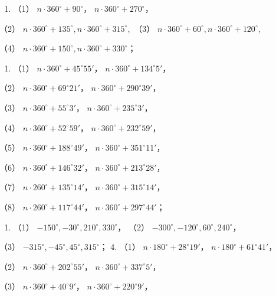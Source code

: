 \begin{enumerate}
\item
  （1） \(n \cdot 360^{\circ} + 90^{\circ}\)，
  \(n \cdot 360^{\circ} + 270^{\circ}\)，
\end{enumerate}

（2）
\(n \cdot 360^{\circ} + 135^{\circ}, n \cdot 360^{\circ} + 315^{\circ},\)
（3）
\(n \cdot 360^{\circ} + 60^{\circ}, n \cdot 360^{\circ} + 120^{\circ},\)

（4）
\(n \cdot 360^{\circ} + 150^{\circ}, n \cdot 360^{\circ} + 330^{\circ}\)；

\begin{enumerate}[start=2]
\item
  （1） \(n \cdot 360^{\circ} + 45^{\circ}55'\)，
  \(n \cdot 360^{\circ} + 134^{\circ}5'\)，
\end{enumerate}

（2） \(n \cdot 360^{\circ} + 69^{\circ}21'\)，
\(n \cdot 360^{\circ} + 290^{\circ}39'\)，

（3） \(n \cdot 360^{\circ} + 55^{\circ}3'\)，
\(n \cdot 360^{\circ} + 235^{\circ}3'\)，

（4） \(n \cdot 360^{\circ} + 52^{\circ}59'\)，
\(n \cdot 360^{\circ} + 232^{\circ}59'\)，

（5） \(n \cdot 360^{\circ} + 188^{\circ}49'\)，
\(n \cdot 360^{\circ} + 351^{\circ}11'\)，

（6） \(n \cdot 360^{\circ} + 146^{\circ}32'\)，
\(n \cdot 360^{\circ} + 213^{\circ}28'\)，

（7） \(n \cdot 260^{\circ} + 135^{\circ}14'\)，
\(n \cdot 360^{\circ} + 315^{\circ}14'\)，

（8） \(n \cdot 260^{\circ} + 117^{\circ}44'\)，
\(n \cdot 360^{\circ} + 297^{\circ}44'\)；

\begin{enumerate}[start=3]
\item
  （1） \(-150^{\circ}, -30^{\circ}, 210^{\circ}, 330^{\circ}\)， （2）
  \(-300^{\circ}, -120^{\circ}, 60^{\circ}, 240^{\circ}\)，
\end{enumerate}

（3） \(-315^{\circ}, -45^{\circ}, 45^{\circ}, 315^{\circ}\)； 4. （1）
\(n \cdot 180^{\circ} + 28^{\circ}19'\)，
\(n \cdot 180^{\circ} + 61^{\circ}41'\)，

（2） \(n \cdot 360^{\circ} + 202^{\circ}55'\)，
\(n \cdot 360^{\circ} + 337^{\circ}5'\)，

（3） \(n \cdot 360^{\circ} + 40^{\circ}9'\)，
\(n \cdot 360^{\circ} + 220^{\circ}9'\)，

